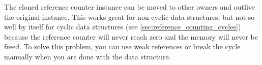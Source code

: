 The cloned reference counter instance can be moved to other owners and outlive the original instance.
This works great for non-cyclic data structures, but not so well by itself for cyclic data structures
(see \autoref{sec:reference_counting_cycles}) because the reference counter will never reach zero
and the memory will never be freed.
To solve this problem, you can use weak references or break the cycle manually
when you are done with the data structure.


